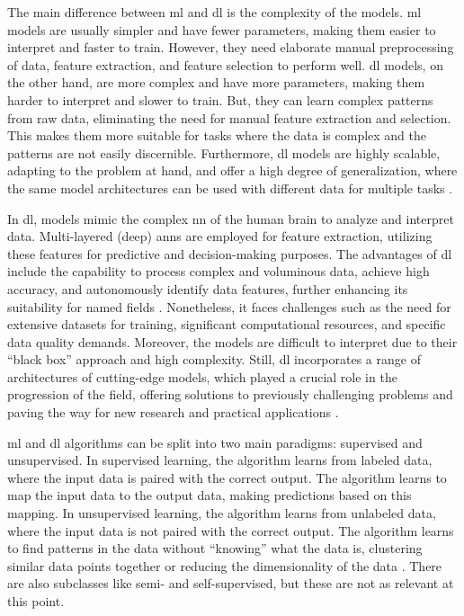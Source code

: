 The main difference between \gls{ml} and \gls{dl} is the complexity of the models. \gls{ml} models are usually simpler and have fewer parameters, making them easier to interpret and faster to train. However, they need elaborate manual preprocessing of data, feature extraction, and feature selection to perform well. \gls{dl} models, on the other hand, are more complex and have more parameters, making them harder to interpret and slower to train. But, they can learn complex patterns from raw data, eliminating the need for manual feature extraction and selection. This makes them more suitable for tasks where the data is complex and the patterns are not easily discernible. Furthermore, \gls{dl} models are highly scalable, adapting to the problem at hand, and offer a high degree of generalization, where the same model architectures can be used with different data for multiple tasks \autocite{Alzubaidi.Zhang.ea2021}.

In \gls{dl}, models mimic the complex \gls{nn} of the human brain to analyze and interpret data. Multi-layered (deep) \glspl{ann} are employed for feature extraction, utilizing these features for predictive and decision-making purposes. The advantages of \gls{dl} include the capability to process complex and voluminous data, achieve high accuracy, and autonomously identify data features, further enhancing its suitability for named fields \autocite{Bernard2021,Szeliski2022}. Nonetheless, it faces challenges such as the need for extensive datasets for training, significant computational resources, and specific data quality demands. Moreover, the models are difficult to interpret due to their \enquote{black box} approach and high complexity. Still, \gls{dl} incorporates a range of architectures of cutting-edge models, which played a crucial role in the progression of the field, offering solutions to previously challenging problems and paving the way for new research and practical applications \autocite{Sarker2021,Cao2022,Reichstein.Camps-Valls.ea2019}.

\gls{ml} and \gls{dl} algorithms can be split into two main paradigms: supervised and unsupervised. In supervised learning, the algorithm learns from labeled data, where the input data is paired with the correct output. The algorithm learns to map the input data to the output data, making predictions based on this mapping. In unsupervised learning, the algorithm learns from unlabeled data, where the input data is not paired with the correct output. The algorithm learns to find patterns in the data without \enquote{knowing} what the data is, clustering similar data points together or reducing the dimensionality of the data \autocite{Goodfellow.Bengio.ea2016,Shinde.Shah2018,Szeliski2022,Zhang.Lipton.ea2023}. There are also subclasses like semi- and self-supervised, but these are not as relevant at this point.


